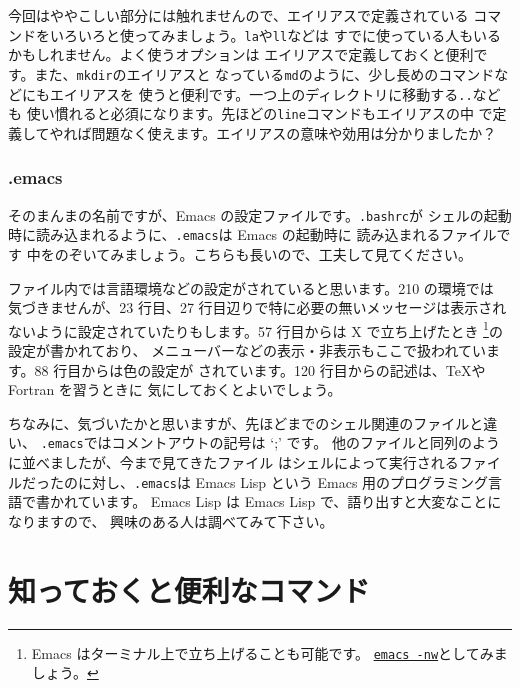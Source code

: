 \documentclass[a4j]{ltjreport}
\begin{document}
    今回はややこしい部分には触れませんので、エイリアスで定義されている
    コマンドをいろいろと使ってみましょう。\verb+la+や\verb+ll+などは
    すでに使っている人もいるかもしれません。よく使うオプションは
    エイリアスで定義しておくと便利です。また、\verb+mkdir+のエイリアスと
    なっている\verb+md+のように、少し長めのコマンドなどにもエイリアスを
    使うと便利です。一つ上のディレクトリに移動する\verb+..+なども
    使い慣れると必須になります。先ほどの\verb+line+コマンドもエイリアスの中
    で定義してやれば問題なく使えます。エイリアスの意味や効用は分かりましたか？

    \subsection{.emacs}
    そのまんまの名前ですが、Emacs の設定ファイルです。\verb+.bashrc+が
    シェルの起動時に読み込まれるように、\verb+.emacs+は Emacs の起動時に
    読み込まれるファイルです
    中をのぞいてみましょう。こちらも長いので、工夫して見てください。

    ファイル内では言語環境などの設定がされていると思います。210 の環境では
    気づきませんが、23 行目、27 行目辺りで特に必要の無いメッセージは表示され
    ないように設定されていたりもします。57 行目からは X で立ち上げたとき
    \footnote{Emacs はターミナル上で立ち上げることも可能です。
    \underline{\texttt{emacs -nw}}としてみましょう。}の設定が書かれており、
    メニューバーなどの表示・非表示もここで扱われています。88 行目からは色の設定が
    されています。120 行目からの記述は、\TeX や Fortran を習うときに
    気にしておくとよいでしょう。

    ちなみに、気づいたかと思いますが、先ほどまでのシェル関連のファイルと違い、
    \verb+.emacs+ではコメントアウトの記号は `;' です。
    他のファイルと同列のように並べましたが、今まで見てきたファイル
    はシェルによって実行されるファイルだったのに対し、\verb+.emacs+は 
    Emacs Lisp という Emacs 用のプログラミング言語で書かれています。
    Emacs Lisp は Emacs Lisp で、語り出すと大変なことになりますので、
    興味のある人は調べてみて下さい。





    \chapter{知っておくと便利なコマンド}
\end{document}
